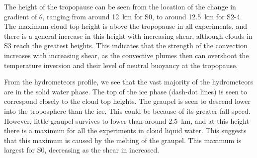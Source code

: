 \documentclass[11pt,a4paper]{article}
\newcommand\todo[1]{\textbf{TODO: #1}}
\begin{document}
The height of the tropopause can be seen from the location of the change in gradient of $\theta$, ranging from around \SI{12}{km} for S0, to around \SI{12.5}{km} for S2-4. The maximum cloud top height is above the tropopause in all experiments, and there is a general increase in this height with increasing shear, although clouds in S3 reach the greatest heights. This indicates that the strength of the convection increases with increasing shear, as the convective plumes then can overshoot the temperature inversion and their level of neutral buoyancy at the tropopause. 

From the hydrometeors profile, we see that the vast majority of the hydrometeors are in the solid water phase. The top of the ice phase (dash-dot lines) is seen to correspond closely to the cloud top heights. The graupel is seen to descend lower into the troposphere than the ice. This could be because of its greater fall speed. However, little graupel survives to lower than around \SI{2.5}{km}, and at this height there is a maximum for all the experiments in cloud liquid water. This suggests that this maximum is caused by the melting of the graupel. This maximum is largest for S0, decreasing as the shear in increased. 


\end{document}
